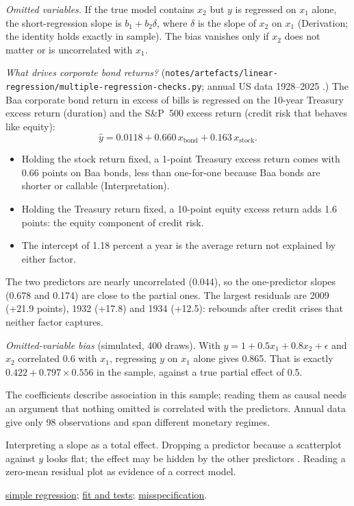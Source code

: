 \begin{qfmethod}
\emph{Omitted variables.} If the true model contains $x_2$ but $y$ is regressed on $x_1$ alone, the short-regression slope is $b_1+b_2\delta$, where $\delta$ is the slope of $x_2$ on $x_1$ (Derivation; the identity holds exactly in sample). The bias vanishes only if $x_2$ does not matter or is uncorrelated with $x_1$.

 \emph{What drives corporate bond returns?} (\texttt{notes/artefacts/linear-regression/multiple-regression-checks.py}; annual US data 1928--2025 \citep[sheet ``Returns by year'']{us-asset-returns-1928-2025}.) The Baa corporate bond return in excess of bills is regressed on the 10-year Treasury excess return (duration) and the S\&P~500 excess return (credit risk that behaves like equity):
\[ \widehat{y}=0.0118+0.660\,x_{\text{bond}}+0.163\,x_{\text{stock}}. \]
\begin{itemize}
\item Holding the stock return fixed, a 1-point Treasury excess return comes with 0.66 points on Baa bonds, less than one-for-one because Baa bonds are shorter or callable (Interpretation).
\item Holding the Treasury return fixed, a 10-point equity excess return adds 1.6 points: the equity component of credit risk.
\item The intercept of 1.18 percent a year is the average return not explained by either factor.
\end{itemize}
The two predictors are nearly uncorrelated (0.044), so the one-predictor slopes (0.678 and 0.174) are close to the partial ones. The largest residuals are 2009 (+21.9 points), 1932 (+17.8) and 1934 (+12.5): rebounds after credit crises that neither factor captures.

\emph{Omitted-variable bias} (simulated, 400 draws). With $y=1+0.5x_1+0.8x_2+\epsilon$ and $x_2$ correlated 0.6 with $x_1$, regressing $y$ on $x_1$ alone gives 0.865. That is exactly $0.422+0.797\times0.556$ in the sample, against a true partial effect of 0.5.

 The coefficients describe association in this sample; reading them as causal needs an argument that nothing omitted is correlated with the predictors. Annual data give only 98 observations and span different monetary regimes.

 Interpreting a slope as a total effect. Dropping a predictor because a scatterplot against $y$ looks flat; the effect may be hidden by the other predictors \citep[sec.~7.5]{s7-hyndman}. Reading a zero-mean residual plot as evidence of a correct model.

 \hyperref[meth:simple-regression-estimation]{simple regression}; \hyperref[meth:multiple-regression-fit-tests]{fit and tests}; \hyperref[meth:regression-misspecification]{misspecification}.

\end{qfmethod}

